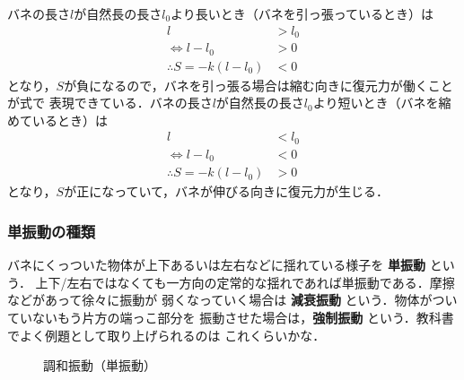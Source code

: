         バネの長さ$l$が自然長の長さ${l}_{0}$より長いとき（バネを引っ張っているとき）は
        \begin{align*}
                                      l  &> {l}_{0} \\
            \Leftrightarrow l - {l}_{0}  &> 0       \\
            \therefore S = -k(l-{l}_{0}) &< 0
        \end{align*}
        となり，$S$が負になるので，バネを引っ張る場合は縮む向きに復元力が働くことが式で
        表現できている．バネの長さ$l$が自然長の長さ${l}_{0}$より短いとき（バネを縮めているとき）は
        \begin{align*}
                                      l  &< {l}_{0} \\
            \Leftrightarrow l - {l}_{0}  &< 0       \\
            \therefore S = -k(l-{l}_{0}) &> 0
        \end{align*}
        となり，$S$が正になっていて，バネが伸びる向きに復元力が生じる．


    \subsubsection{単振動の種類}
        バネにくっついた物体が上下あるいは左右などに揺れている様子を \textbf{単振動} という．
        上下/左右ではなくても一方向の定常的な揺れであれば単振動である．摩擦などがあって徐々に振動が
        弱くなっていく場合は \textbf{減衰振動} という．物体がついていないもう片方の端っこ部分を
        振動させた場合は，\textbf{強制振動} という．教科書でよく例題として取り上げられるのは
        これくらいかな．
        \begin{figure}[hbt]
            \begin{center}
                \caption{調和振動（単振動）}
                \label{fig:tanshindo_0}
            \end{center}
        \end{figure}


